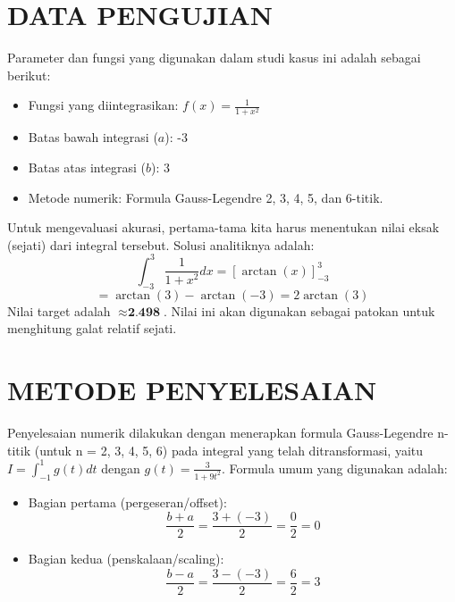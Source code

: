 \documentclass[conference]{IEEEtran}
\begin{document}
\section{DATA PENGUJIAN}
Parameter dan fungsi yang digunakan dalam studi kasus ini adalah sebagai berikut:
\begin{itemize}
    \item Fungsi yang diintegrasikan: $f(x) = \frac{1}{1+x^2}$
    \item Batas bawah integrasi ($a$): -3
    \item Batas atas integrasi ($b$): 3
    \item Metode numerik: Formula Gauss-Legendre 2, 3, 4, 5, dan 6-titik.
\end{itemize}
Untuk mengevaluasi akurasi, pertama-tama kita harus menentukan nilai eksak (sejati) dari integral tersebut. Solusi analitiknya adalah:
\begin{equation}
    \int_{-3}^{3} \frac{1}{1+x^2} dx = [\arctan(x)]_{-3}^{3}
\end{equation}
\begin{equation}
    = \arctan(3) - \arctan(-3) = 2 \arctan(3)
\end{equation}
Nilai target adalah $\approx \textbf{2.498}$. Nilai ini akan digunakan sebagai patokan untuk menghitung galat relatif sejati.


\section{METODE PENYELESAIAN}
Penyelesaian numerik dilakukan dengan menerapkan formula Gauss-Legendre n-titik (untuk n = 2, 3, 4, 5, 6) pada integral yang telah ditransformasi, yaitu $I = \int_{-1}^{1} g(t) dt$ dengan $g(t) = \frac{3}{1+9t^2}$.
Formula umum yang digunakan adalah:
\begin{itemize}
    \item Bagian pertama (pergeseran/offset):
    \begin{equation}
        \frac{b+a}{2} = \frac{3+(-3)}{2} = \frac{0}{2} = 0
    \end{equation}

    \item Bagian kedua (penskalaan/scaling):
    \begin{equation}
        \frac{b-a}{2} = \frac{3-(-3)}{2} = \frac{6}{2} = 3
    \end{equation}
\end{itemize}
\end{document}
